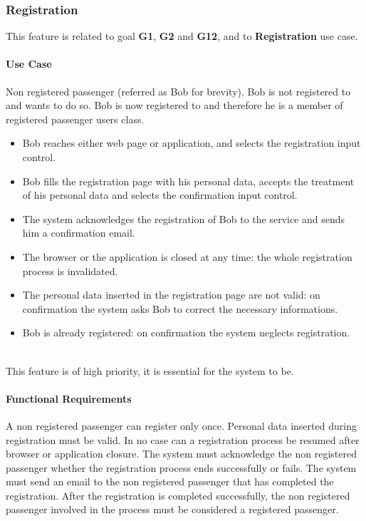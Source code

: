 \subsubsection{Registration}
This feature is related to goal \textbf{G1}, \textbf{G2} and \textbf{G12}, and to \textbf{Registration} use case.
\paragraph{Use Case}
\begin{itemize}
	 Non registered passenger (referred as Bob for brevity).
	 Bob is not registered to \myTaxiService{} and wants to do so.
	 Bob is now registered to \myTaxiService{} and therefore he is a member of registered passenger users class.
	\begin{itemize}
		\item Bob reaches either \myTaxiService{} web page or application, and selects the registration input control.
		\item Bob fills the registration page with his personal data, accepts the treatment of his personal data and selects the confirmation input control.
		\item The system acknowledges the registration of Bob to the service and sends him a confirmation email.
	\end{itemize}
	\begin{itemize}
		\item The browser or the application is closed at any time: the whole registration process is invalidated.
		\item The personal data inserted in the registration page are not valid: on confirmation the system asks Bob to correct the necessary informations.
		\item Bob is already registered: on confirmation the system neglects registration.
	\end{itemize}
\end{itemize}
\\
This feature is of high priority, it is essential for the system to be.\par
\paragraph{Functional Requirements}
\begin{itemize}
	 A non registered passenger can register only once.
	 Personal data inserted during registration must be valid.
	 In no case can a registration process be resumed after browser or application closure.
	 The system must acknowledge the non registered passenger whether the registration process ends successfully or fails.
	 The system must send an email to the non registered passenger that has completed the registration.
	 After the registration is completed successfully, the non registered passenger involved in the process must be considered a registered passenger.
\end{itemize}
